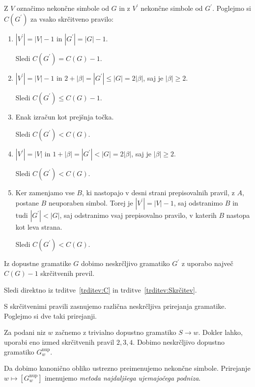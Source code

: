 \documentclass[fin1, tisk]{fmfdelo}
\providecommand{\abs}[1]{\left\lvert #1 \right\rvert}
\theoremstyle{definition}
\begin{document}
\begin{dokaz}
    Z $V$ označimo nekončne simbole od $G$ in z $V^\prime$ nekončne simbole od $G^\prime$. 
    Poglejmo si $C(G^\prime)$ za vsako skrčitveno pravilo:
    \begin{enumerate}
        \item $\abs{V^\prime} = \abs{V} -1$ in $\abs{G^\prime} = \abs{G} - 1$. 
        
        Sledi $C(G^\prime) = C(G) - 1$.
        \item $\abs{V^\prime} = \abs{V} -1$ in 
        $2 + \abs{\beta} =\abs{G^\prime} \leq \abs{G} = 2 \abs{\beta}$, saj je $\abs{\beta} \geq 2$.
        
        Sledi $C(G^\prime) \leq C(G) - 1$.
        \item Enak izračun kot prejšnja točka.

        Sledi $C(G^\prime) < C(G)$.
        \item $\abs{V^\prime} = \abs{V}$ in 
        $ 1 + \abs{\beta} = \abs{G^\prime} < \abs{G} = 2 \abs{\beta}$, saj je $\abs{\beta} \geq 2$.
        
        Sledi $C(G^\prime) < C(G)$.
        \item Ker zamenjamo vse $B$, ki nastopajo v desni strani prepisovalnih pravil, z $A$,
        postane $B$ neuporaben simbol. Torej je $\abs{V^\prime} = \abs{V} - 1$, saj odstranimo $B$
        in tudi $\abs{G^\prime} < \abs{G}$, saj odstranimo vsaj prepisovalno pravilo, v katerih
        $B$ nastopa kot leva strana.

        Sledi $C(G^\prime) < C(G)$.
    \end{enumerate}
\end{dokaz}

\begin{izrek}
    Iz dopustne gramatike $G$ dobimo neskrčljivo gramatiko $G^\prime$ z uporabo največ 
    $C(G) - 1$ skrčitvenih previl.
\end{izrek}

\begin{dokaz}
    Sledi direktno iz trditve~\ref{trditev:C} in trditve~\ref{trditev:Skrčitev}.
\end{dokaz}

S skrčitvenimi pravili zasnujemo različna neskrčljiva prirejanja gramatike. Poglejmo si dve taki
prirejanji.

\begin{definicija}
    Za podani niz $w$ začnemo z trivialno dopustno gramatiko $S \rightarrow w$. 
    Dokler lahko, uporabi eno izmed skrčitvenih pravil $2, 3, 4$. 
    Dobimo neskrčljivo dopustno gramatiko $G^\text{nup}_w$.
    
    Da dobimo kanonično obliko ustrezno preimenujemo nekončne simbole. 
    Prirejanje $w \mapsto [G^\text{nup}_w]$ imenujemo \emph{metoda najdaljšega ujemajočega podniza}.
\end{definicija}
\end{document}
